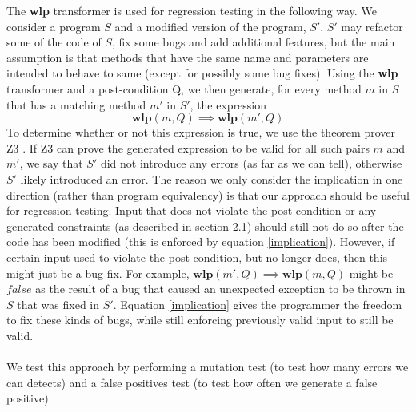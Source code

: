 \documentclass[a4paper, fleqn]{article}
\newcommand{\wlp}{\textbf{wlp}\xspace}
\begin{document}
The \wlp transformer is used for regression testing in the following way. We consider a program $S$ and a modified version of the program, $S'$. $S'$ may refactor some of the code of $S$, fix some bugs and add additional features, but the main assumption is that methods that have the same name and parameters are intended to behave to same (except for possibly some bug fixes). Using the \wlp transformer and a post-condition Q, we then generate, for every method $m$ in $S$ that has a matching method $m'$ in $S'$, the expression \begin{equation}
\wlp(m, Q) \implies \wlp(m', Q)
\label{implication}
\end{equation}
To determine whether or not this expression is true, we use the theorem prover Z3 \cite{z3}. If Z3 can prove the generated expression to be valid for all such pairs $m$ and $m'$, we say that $S'$ did not introduce any errors (as far as we can tell), otherwise $S'$ likely introduced an error. The reason we only consider the implication in one direction (rather than program equivalency) is that our approach should be useful for regression testing. Input that does not violate the post-condition or any generated constraints (as described in section 2.1) should still not do so after the code has been modified (this is enforced by equation \ref{implication}). However, if certain input used to violate the post-condition, but no longer does, then this might just be a bug fix. For example, $\wlp(m', Q) \implies \wlp(m, Q)$ might be $false$ as the result of a bug that caused an unexpected exception to be thrown in $S$ that was fixed in $S'$. Equation \ref{implication} gives the programmer the freedom to fix these kinds of bugs, while still enforcing previously valid input to still be valid.
\\
\\
We test this approach by performing a mutation test (to test how many errors we can detects) and a false positives test (to test how often we generate a false positive).
\end{document}
